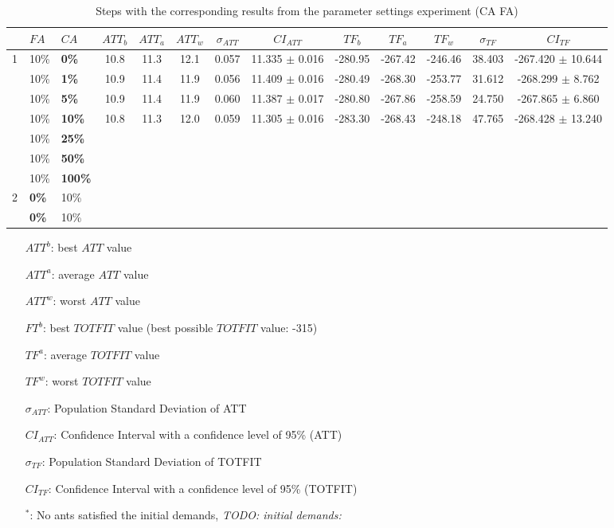 \begin{sidewaystable}
    
    \begin{tabular}{|l|l|l||c|c|c|c|c|c|c|c|c|c|}
    \hline
    ~ & $FA$ & $CA$ & $ATT_{b}$ & $ATT_{a}$ & $ATT_{w}$ & $\sigma_{ATT}$ & $CI_{ATT}$ & $TF_{b}$ & $TF_{a}$ & $TF_{w}$ & $\sigma_{TF}$ & $CI_{TF}$\\
    \hline
    1 & 10\% & \textbf{0\%} & 10.8 & 11.3 & 12.1 & 0.057 & 11.335 $\pm$ 0.016 & -280.95 & -267.42 & -246.46 & 38.403 & -267.420 $\pm$ 10.644\\
    ~ & 10\% & \textbf{1\%} & 10.9 & 11.4 & 11.9 & 0.056 & 11.409 $\pm$ 0.016 & -280.49 & -268.30 & -253.77 & 31.612 & -268.299 $\pm$ 8.762\\
    ~ & 10\% & \textbf{5\%} & 10.9 & 11.4 & 11.9 & 0.060 & 11.387 $\pm$ 0.017 & -280.80 & -267.86 & -258.59 & 24.750 & -267.865 $\pm$ 6.860\\
    ~ & 10\% & \textbf{10\%} & 10.8 & 11.3 & 12.0 & 0.059 & 11.305 $\pm$ 0.016 & -283.30 & -268.43 & -248.18 & 47.765 & -268.428 $\pm$ 13.240 \\
    ~ & 10\% & \textbf{25\%} & ~ & ~ & ~ & ~ & ~ & ~ & ~ & ~ & ~ & ~ \\
    ~ & 10\% & \textbf{50\%} & ~ & ~ & ~ & ~ & ~ & ~ & ~ & ~ & ~ & ~ \\
    ~ & 10\% & \textbf{100\%} & ~ & ~ & ~ & ~ & ~ & ~ & ~ & ~ & ~ & ~ \\
    \hline
    2 & \textbf{0\%} & 10\% & ~ & ~ & ~ & ~ & ~ & ~ & ~ & ~ & ~ & ~ \\
    ~ & \textbf{0\%} & 10\% & ~ & ~ & ~ & ~ & ~ & ~ & ~ & ~ & ~ & ~ \\
    \hline
    \end{tabular}
    \caption {Steps with the corresponding results from the parameter settings experiment (CA FA)}
    \tiny
    \begin{itemize}[noitemsep]
    \item[$ATT^b$:] best $ATT$ value
    \item[$ATT^a$:] average $ATT$ value
    \item[$ATT^w$:] worst $ATT$ value
    \item[$FT^b$:] best $TOTFIT$ value (best possible $TOTFIT$ value: -315)
    \item[$TF^a$:] average $TOTFIT$ value
    \item[$TF^w$:] worst $TOTFIT$ value
    \item[$\sigma_{ATT}$:] Population Standard Deviation of ATT
    \item[$CI_{ATT}$:] Confidence Interval with a confidence level of 95\% (ATT)
    \item[$\sigma_{TF}$:] Population Standard Deviation of TOTFIT
    \item[$CI_{TF}$:] Confidence Interval with a confidence level of 95\% (TOTFIT)
    \item[$^*$:] No ants satisfied the initial demands, \emph{\color{blue} TODO: initial demands: }
    \end{itemize}
    \label{table:pm2}
\end{sidewaystable}



